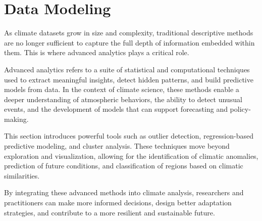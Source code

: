 \chapter{Data Modeling}

As climate datasets grow in size and complexity, traditional descriptive methods are no longer sufficient to capture the full depth of information embedded within them. This is where advanced analytics plays a critical role.

Advanced analytics refers to a suite of statistical and computational techniques used to extract meaningful insights, detect hidden patterns, and build predictive models from data. In the context of climate science, these methods enable a deeper understanding of atmospheric behaviors, the ability to detect unusual events, and the development of models that can support forecasting and policy-making.

This section introduces powerful tools such as outlier detection, regression-based predictive modeling, and cluster analysis. These techniques move beyond exploration and visualization, allowing for the identification of climatic anomalies, prediction of future conditions, and classification of regions based on climatic similarities.

By integrating these advanced methods into climate analysis, researchers and practitioners can make more informed decisions, design better adaptation strategies, and contribute to a more resilient and sustainable future.




